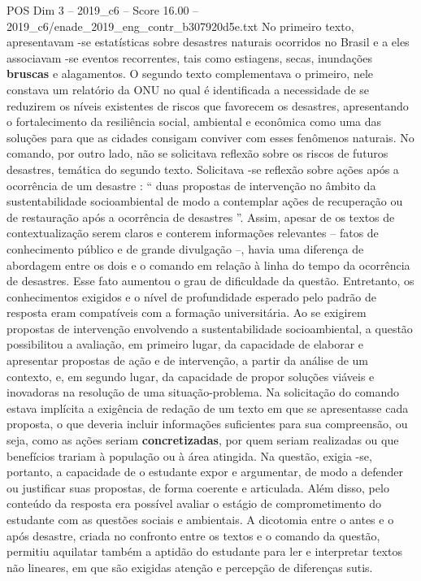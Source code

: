 \begin{textsample}{POS Dim 3 – 2019\_c6 – Score 16.00 – 2019\_c6/enade\_2019\_eng\_contr\_b307920d5e.txt}
No primeiro texto, apresentavam -se estatísticas sobre desastres naturais ocorridos no Brasil e a eles associavam -se eventos recorrentes, tais como estiagens, secas, inundações \textbf{bruscas} e alagamentos.
O segundo texto complementava o primeiro, nele constava um relatório da ONU no qual é identificada a necessidade de se reduzirem os níveis existentes de riscos que favorecem os desastres, apresentando o fortalecimento da resiliência social, ambiental e econômica como uma das soluções para que as cidades consigam conviver com esses fenômenos naturais.
No comando, por outro lado, não se solicitava reflexão sobre os riscos de futuros desastres, temática do segundo texto.
Solicitava -se reflexão sobre ações após a ocorrência de um desastre : “ duas propostas de intervenção no âmbito da sustentabilidade socioambiental de modo a contemplar ações de recuperação ou de restauração após a ocorrência de desastres ”.
Assim, apesar de os textos de contextualização serem claros e conterem informações relevantes – fatos de conhecimento público e de grande divulgação –, havia uma diferença de abordagem entre os dois e o comando em relação à linha do tempo da ocorrência de desastres.
Esse fato aumentou o grau de dificuldade da questão.
Entretanto, os conhecimentos exigidos e o nível de profundidade esperado pelo padrão de resposta eram compatíveis com a formação universitária.
Ao se exigirem propostas de intervenção envolvendo a sustentabilidade socioambiental, a questão possibilitou a avaliação, em primeiro lugar, da capacidade de elaborar e apresentar propostas de ação e de intervenção, a partir da análise de um contexto, e, em segundo lugar, da capacidade de propor soluções viáveis e inovadoras na resolução de uma situação-problema.
Na solicitação do comando estava implícita a exigência de redação de um texto em que se apresentasse cada proposta, o que deveria incluir informações suficientes para sua compreensão, ou seja, como as ações seriam \textbf{concretizadas}, por quem seriam realizadas ou que benefícios trariam à população ou à área atingida.
Na questão, exigia -se, portanto, a capacidade de o estudante expor e argumentar, de modo a defender ou justificar suas propostas, de forma coerente e articulada.
Além disso, pelo conteúdo da resposta era possível avaliar o estágio de comprometimento do estudante com as questões sociais e ambientais.
A dicotomia entre o antes e o após desastre, criada no confronto entre os textos e o comando da questão, permitiu aquilatar também a aptidão do estudante para ler e interpretar textos não lineares, em que são exigidas atenção e percepção de diferenças sutis.

\end{textsample}

